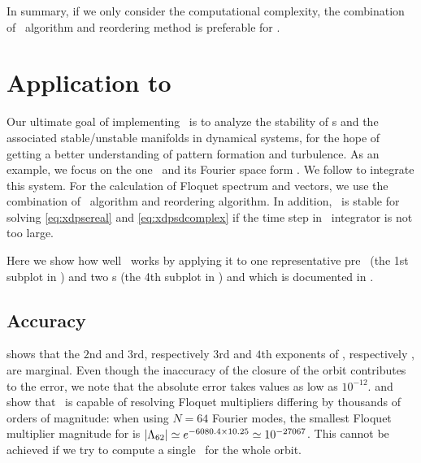 In summary, if we only consider the computational complexity,
the combination
of \psd\ algorithm and reordering method is preferable for \ped.

\section{Application to \KSe}
\label{sect:applic}

Our ultimate goal of implementing \ped\ is to analyze the stability
of \po s and the associated stable/unstable manifolds in
dynamical systems, for the hope of getting a better understanding
of pattern formation and turbulence.
As an example, we focus on the one\dmn\ \KSe {}
and its Fourier space form . We follow
 to integrate this system. For the
calculation of Floquet spectrum and vectors,
we use the combination of \psd\ algorithm and reordering
algorithm. In addition, \Gepp\
is stable for solving
\eqref{eq:xdpsereal} and \eqref{eq:xdpsdcomplex} if the
time step in \KS\ integrator is not too {large}.

Here we show how well \ped\ works
by applying it to one representative pre\po\ 
(the 1st subplot in )
and two
\rpo s  (the 4th subplot in )
and  which is documented in .

\subsection{Accuracy}

 shows that the $2$nd and $3$rd,
respectively $3$rd and $4$th exponents of ,
respectively , are marginal.
Even though the inaccuracy of the closure of the orbit contributes to the error,
we note that the absolute error takes values as low as $10^{-12}$.
\refTab{tab:floquet_ppo1} and
 show that \psd\ is capable of resolving
Floquet multipliers differing by thousands of orders of magnitude:
when using $N=64$ Fourier modes, the smallest Floquet multiplier magnitude
for \PPO{10.25} is
$|\Lambda_{62}| \simeq e^{-6080.4\times 10.25}\simeq 10^{-27067}$.
This cannot be achieved if we try to compute a single
\JacobianM\  for the whole orbit.

